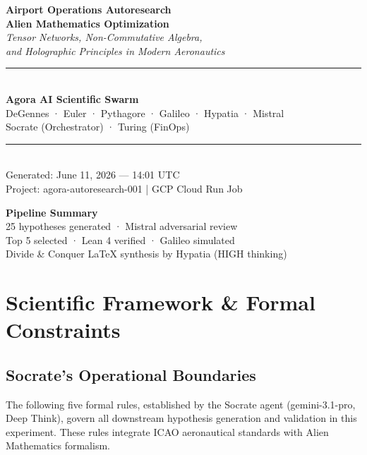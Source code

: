 \documentclass[11pt,a4paper]{report}
\begin{document}
\begin{titlepage}
  \centering
  \vspace*{2cm}
  {\Huge\bfseries Airport Operations Autoresearch\\[0.5em]}
  {\Large\bfseries Alien Mathematics Optimization\\[1em]}
  {\large\itshape Tensor Networks, Non-Commutative Algebra,\\
    and Holographic Principles in Modern Aeronautics\\[2em]}
  \rule{0.8\textwidth}{1pt}\\[1em]
  {\large\bfseries Agora AI Scientific Swarm}\\[0.5em]
  {DeGennes · Euler · Pythagore · Galileo · Hypatia · Mistral}\\[0.5em]
  {Socrate (Orchestrator) · Turing (FinOps)}\\[1em]
  \rule{0.8\textwidth}{1pt}\\[1em]
  {\normalsize Generated: June 11, 2026 — 14:01 UTC}\\
  {\normalsize Project: agora-autoresearch-001 | GCP Cloud Run Job}\\[2em]
  \begin{tcolorbox}[width=0.7\textwidth,colback=yellow!10,colframe=orange!80!black]
    \centering
    \textbf{Pipeline Summary}\\[0.5em]
    25 hypotheses generated · Mistral adversarial review\\
    Top 5 selected · Lean 4 verified · Galileo simulated\\
    Divide \& Conquer LaTeX synthesis by Hypatia (HIGH thinking)
  \end{tcolorbox}
\end{titlepage}

\tableofcontents
\listoffigures
\newpage

\chapter{Scientific Framework \& Formal Constraints}
\section{Socrate's Operational Boundaries}
The following five formal rules, established by the Socrate agent (gemini-3.1-pro, Deep Think),
govern all downstream hypothesis generation and validation in this experiment.
These rules integrate ICAO aeronautical standards with Alien Mathematics formalism.
\end{document}
